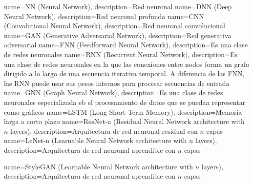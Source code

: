        {name={NN (Neural Network)},                                                description={Red neuronal}}
      {name={DNN (Deep Neural Network)},                                          description={Red neuronal profunda}}
      {name={CNN (Convolutional Neural Network)},                                 description={Red neuronal convolucional}}
      {name={GAN (Generative Adversarial Network)},                               description={Red generativa adversarial}}
      {name={FNN (Feedforward Neural Network)},                                   description={Es una clase de redes neuronales}}
      {name={RNN (Recurrent Neural Network)},                                     description={Es una clase de redes neuronales en la que las conexiones entre nodos forma un grafo dirigido a lo largo de una secuencia iterativa temporal. A diferencia de las FNN, las RNN puede usar sus pesos internos para procesar secuencias de entrada}}
      {name={GNN (Graph Neural Network)},                                         description={Es una clase de redes neuronales especializada eb el procesamiento de datos que se puedan representar como gráficos}}
     {name={LSTM (Long Short-Term Memory)},                                      description={Memoria larga a corto plazo}}
 {name={ResNet-n (Residual Neural Network architecture with $n$ layers)},    description={Arquitectura de red neuronal residual con $n$ capas}}
  {name={LeNet-n (Learnable Neural Network architecture with $n$ layers)},    description={Arquitectura de red neuronal aprendible con $n$ capas}}

  {name={StyleGAN (Learnable Neural Network architecture with $n$ layers)},    description={Arquitectura de red neuronal aprendible con $n$ capas}}



